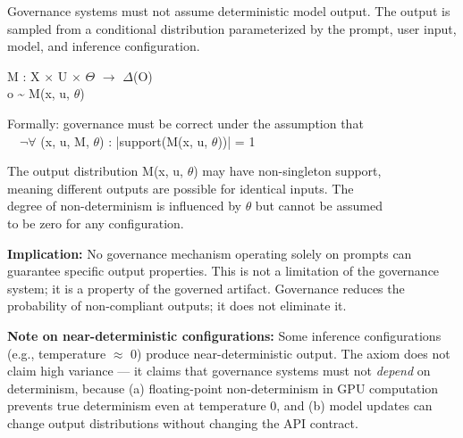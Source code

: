 \begin{caxiom}

Governance systems must not assume deterministic model output. The output is sampled from a conditional distribution parameterized by the prompt, user input, model, and inference configuration.

\begin{claddisp}
M : X $\times$ U $\times$ $\Theta$ $\to$ $\Delta$(O)\\
o \textasciitilde{} M(x, u, $\theta$)
\par\smallskip
Formally: governance must be correct under the assumption that\\
~~$\neg$$\forall$ (x, u, M, $\theta$) : |support(M(x, u, $\theta$))| = 1
\par\smallskip
The output distribution M(x, u, $\theta$) may have non-singleton support,\\
meaning different outputs are possible for identical inputs. The\\
degree of non-determinism is influenced by $\theta$ but cannot be assumed\\
to be zero for any configuration.
\end{claddisp}


\end{caxiom}

\textbf{Implication:} No governance mechanism operating solely on prompts can guarantee specific output properties. This is not a limitation of the governance system; it is a property of the governed artifact. Governance reduces the probability of non-compliant outputs; it does not eliminate it.

\textbf{Note on near-deterministic configurations:} Some inference configurations (e.g., temperature $\approx$ 0) produce near-deterministic output. The axiom does not claim high variance --- it claims that governance systems must not \emph{depend} on determinism, because (a) floating-point non-determinism in GPU computation prevents true determinism even at temperature 0, and (b) model updates can change output distributions without changing the API contract.

